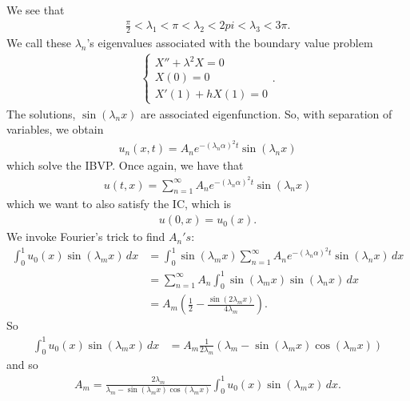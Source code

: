 \documentclass{book}
\theoremstyle{definition}
\begin{document}
We see that
\begin{align*}
\frac{\pi}{2} < \lambda_1 < \pi < \lambda_2 < 2pi < \lambda_3 < 3\pi.
\end{align*}
We call these $\lambda_n$'s eigenvalues associated with the boundary value problem
\begin{align}
\begin{cases}
X'' + \lambda^2 X = 0\\
X(0) = 0\\
X'(1) + hX(1) = 0
\end{cases}.
\end{align}
The solutions, $\sin(\lambda_n x)$ are associated eigenfunction. So, with separation of variables, we obtain
\begin{align*}
u_n(x,t) = A_n e^{-(\lambda_n\alpha)^2t}\sin(\lambda_n x)
\end{align*}
which solve the IBVP. Once again, we have that
\begin{align*}
u(t,x) = \sum_{n=1}^{\infty} A_n e^{-(\lambda_n\alpha)^2t}\sin(\lambda_n x)
\end{align*}
which we want to also satisfy the IC, which is 
\begin{align*}
u(0,x) = u_0(x).
\end{align*}
We invoke Fourier's trick to find $A_n's$:
\begin{align*}
\int_{0}^1 u_0(x)\sin(\lambda_m x)\,dx &= \int_{0}^1 \sin(\lambda_m x)\sum_{n=1}^{\infty} A_n e^{-(\lambda_n\alpha)^2t}\sin(\lambda_n x)\,dx\\
&= \sum_{n=1}^\infty A_n\int_{0}^1 \sin(\lambda_m x)\sin(\lambda_n x)\,dx\\
&= A_m \left( \frac{1}{2} - \frac{\sin(2\lambda_m x)}{4\lambda_m} \right).
\end{align*}
So
\begin{align*}
\int_{0}^1 u_0(x)\sin(\lambda_m x) \,dx &= A_m \frac{1}{2\lambda_m}\left( \lambda_m - \sin(\lambda_m x)\cos(\lambda_m x) \right)
\end{align*}
and so
\begin{align*}
A_m = \frac{2\lambda_m}{\lambda_m - \sin(\lambda_m x)\cos(\lambda_m x)}\int_{0}^1 u_0(x)\sin(\lambda_m x) \,dx.
\end{align*}
\end{document}
